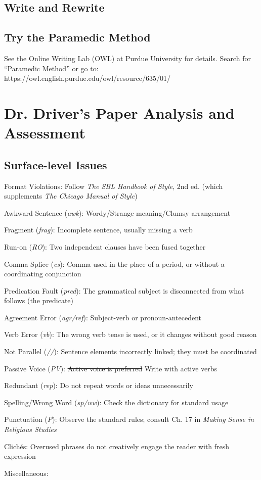 \documentclass[11pt,twocolumn]{article}
\begin{document}
\subsection{Write and Rewrite}

\subsection{Try the Paramedic Method}

See the Online Writing Lab (OWL) at Purdue University for details.
Search for “Paramedic Method” or go to:
https://owl.english.purdue.edu/owl/resource/635/01/

\onecolumn
\thispagestyle{empty}
\section*{Dr. Driver's Paper Analysis and Assessment}

\subsection*{Surface-level Issues}

\begin{issues}

\item Format Violations: Follow \emph{The SBL Handbook of Style}, 2nd ed. (which supplements \emph{The Chicago Manual of Style})
\item Awkward Sentence (\emph{awk}): Wordy/Strange meaning/Clumsy arrangement
\item Fragment (\emph{frag}): Incomplete sentence, usually missing a verb
\item Run-on (\emph{RO}): Two independent clauses have been fused together
\item Comma Splice (\emph{cs}): Comma used in the place of a period, or without a coordinating conjunction
\item Predication Fault (\emph{pred}): The grammatical subject is disconnected from what follows (the predicate)
\item Agreement Error (\emph{agr/ref}): Subject-verb or pronoun-antecedent
\item Verb Error (\emph{vb}): The wrong verb tense is used, or it changes without good reason
\item Not Parallel (\emph{//}): Sentence elements incorrectly linked; they must be coordinated
\item Passive Voice (\emph{PV}): \sout{Active voice is preferred} Write with active verbs
\item Redundant (\emph{rep}): Do not repeat words or ideas unnecessarily
\item Spelling/Wrong Word (\emph{sp/ww}): Check the dictionary for standard usage
\item Punctuation (\emph{P}): Observe the standard rules; consult Ch. 17 in \emph{Making Sense in Religious Studies}
\item Clichés: Overused phrases do not creatively engage the reader with fresh expression
\item Miscellaneous:

\end{issues}
\end{document}
